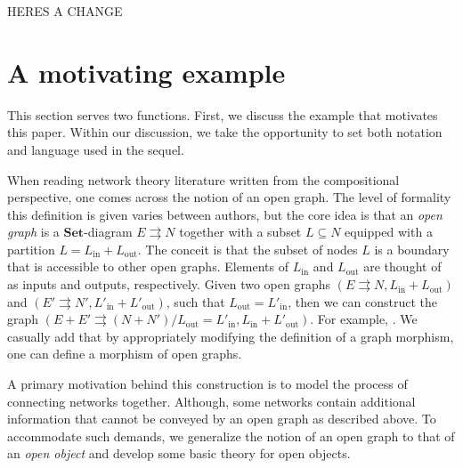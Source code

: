 \documentclass{amsart}
\newcommand{\Set}{\cat{Set}}
\newcommand{\cat}[1]{\mathbf{#1}}
\renewcommand{\t}[1]{\text{#1}}
\theoremstyle{remark}
\theoremstyle{definition}
\begin{document}
HERES A CHANGE


\section{A motivating example}
\label{sec:motivating-example}

This section serves two functions. First, we discuss the example that motivates this paper.  Within our discussion, we take the opportunity to set both notation and language used in the sequel.  

When reading network theory literature written from the compositional perspective, one comes across the notion of an open graph. 
The level of formality this definition is given varies between authors, but the core idea is that an \emph{open graph} is a $ \Set $-diagram $ E \rightrightarrows N $ together with a subset $ L \subseteq N$ equipped with a partition $ L = L_{ \t{in} } + L_{ \t{out} } $.
The conceit is that the subset of nodes $ L $ is a boundary that is accessible to other open graphs. Elements of $ L_{ \t{in} } $ and $ L_{ \t{out} } $ are thought of as inputs and outputs, respectively.  Given two open graphs $ (E \rightrightarrows N , L_{ \t{in} } + L_{ \t{out} }) $ and $ (E' \rightrightarrows N' , L'_{ \t{in} } + L'_{ \t{out} }) $, such that $ L_{ \t{out} } = L'_{ \t{in} } $, then we can construct the graph $ (E + E' \rightrightarrows (N + N') / L_{ \t{out} } = L'_{ \t{in} } ,  L_{ \t{in} } + L'_{ \t{out} } ) $.  For example,
	.
We casually add that by appropriately modifying the definition of a graph morphism, one can define a morphism of open graphs.

A primary motivation behind this construction is to model the process of connecting networks together.  Although, some networks contain additional information that cannot be conveyed by an open graph as described above.
To accommodate such demands, we generalize the notion of an open graph to that of an \emph{open object} and develop some basic theory for open objects.  
\end{document}
